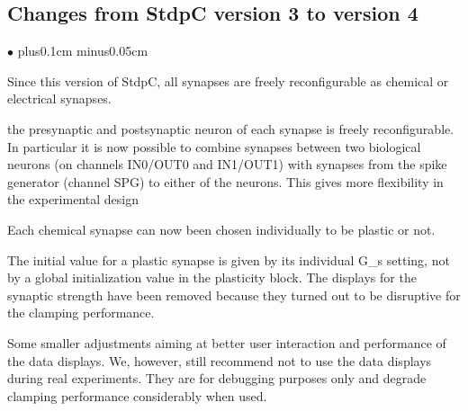 \documentclass{article}
\newenvironment{myitem}{\begin{list}{$\bullet$}{\setlength{\leftmargin}{1.1em}
\itemsep0.1cm plus0.1cm minus0.05cm
\listparindent0cm
\addtolength{\labelsep}{0.5\labelsep}
\setlength{\labelwidth}{0.8em}
\setlength{\leftmargin}{\labelwidth}
\addtolength{\leftmargin}{\labelsep}
}}{\end{list}}
\begin{document}
\subsection{Changes from StdpC version 3 to version 4}
\begin{myitem}
\item Since this version of StdpC, all synapses are freely reconfigurable as
  chemical or electrical synapses.
\item the presynaptic and postsynaptic neuron of each synapse is freely
  reconfigurable. In particular it is now possible to combine synapses
  between two biological neurons (on channels IN0/OUT0  and IN1/OUT1) with
  synapses from 
  the spike generator (channel SPG) to either of the neurons. This gives more
  flexibility in the experimental design
\item Each chemical synapse can now been chosen individually to be plastic or not.
\item The initial value for a plastic synapse is given by its individual G\_s
  setting, not by a global initialization value in the plasticity block. The
  displays for the synaptic strength have been removed because they turned
  out to be disruptive for the clamping performance.
\item Some smaller adjustments aiming at better user interaction and
  performance of the data displays. We, however, still recommend not to use
  the data displays during real experiments. They are for debugging purposes
  only and degrade clamping performance considerably when used.
\end{myitem}
\end{document}
